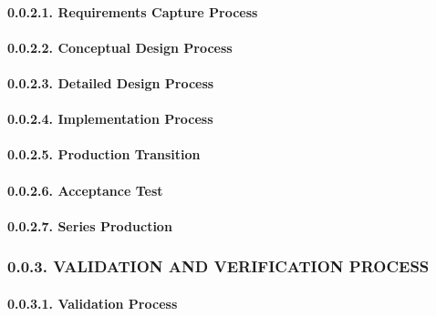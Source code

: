 \documentclass[
]{article}
\begin{document}
\hypertarget{requirements-capture-process}{%
\paragraph{0.0.2.1. Requirements Capture
Process}\label{requirements-capture-process}}

\hypertarget{conceptual-design-process}{%
\paragraph{0.0.2.2. Conceptual Design
Process}\label{conceptual-design-process}}

\hypertarget{detailed-design-process}{%
\paragraph{0.0.2.3. Detailed Design
Process}\label{detailed-design-process}}

\hypertarget{implementation-process}{%
\paragraph{0.0.2.4. Implementation
Process}\label{implementation-process}}

\hypertarget{production-transition}{%
\paragraph{0.0.2.5. Production Transition}\label{production-transition}}

\hypertarget{acceptance-test}{%
\paragraph{0.0.2.6. Acceptance Test}\label{acceptance-test}}

\hypertarget{series-production}{%
\paragraph{0.0.2.7. Series Production}\label{series-production}}

\hypertarget{validation-and-verification-process}{%
\subsubsection{0.0.3. VALIDATION AND VERIFICATION
PROCESS}\label{validation-and-verification-process}}

\hypertarget{validation-process}{%
\paragraph{0.0.3.1. Validation Process}\label{validation-process}}
\end{document}
